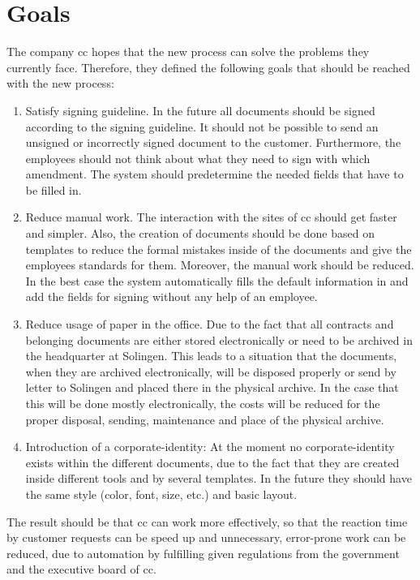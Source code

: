 \section{Goals}
The company \gls{cc} hopes that the new process can solve the problems they currently face. Therefore, they defined the following goals that should be reached with the new process:
\begin{enumerate}
	\item Satisfy signing guideline. \newline
	In the future all documents should be signed according to the signing guideline. It should not be possible to send an unsigned or incorrectly signed document to the customer. Furthermore, the employees should not think about what they need to sign with which amendment. The system should predetermine the needed fields that have to be filled in.
	\item Reduce manual work. \newline
	The interaction with the sites of \gls{cc} should get faster and simpler. Also, the creation of documents should be done based on templates to reduce the formal mistakes inside of the documents and give the employees standards for them. Moreover, the manual work should be reduced. In the best case the system automatically fills the default information in and add the fields for signing without any help of an employee.  
	\item Reduce usage of paper in the office. \newline
	Due to the fact that all contracts and belonging documents are either stored electronically or need to be archived in the headquarter at Solingen. This leads to a situation that the documents, when they are archived electronically, will be disposed properly or send by letter to Solingen and placed there in the physical archive. In the case that this will be done mostly electronically, the costs will be reduced for the proper disposal, sending, maintenance and place of the physical archive. 
	\item Introduction of a corporate-identity: \newline
	At the moment no corporate-identity exists within the different documents, due to the fact that they are created inside different tools and by several templates. In the future they should have the same style (color, font, size, etc.) and basic layout.
\end{enumerate}
The result should be that \gls{cc} can work more effectively, so that the reaction time by customer requests can be speed up and unnecessary, error-prone work can be reduced, due to automation by fulfilling given regulations from the government and the executive board of \gls{cc}.

